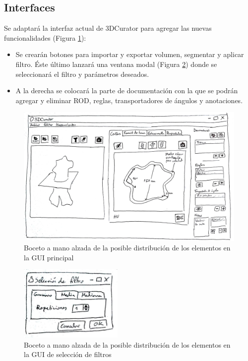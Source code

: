 \subsection{Interfaces}

Se adaptará la interfaz actual de 3DCurator para agregar las nuevas funcionalidades (Figura \ref{fig:requisitos/boceto-gui-ppal}):

\begin{itemize}
	\item Se crearán botones para importar y exportar volumen, segmentar y aplicar filtro. Éste último lanzará una ventana modal (Figura \ref{fig:requisitos/boceto-gui-filtro}) donde se seleccionará el filtro y parámetros deseados.
	\item A la derecha se colocará la parte de documentación con la que se podrán agregar y eliminar ROD, reglas, transportadores de ángulos y anotaciones.
\end{itemize}

\begin{figure}[H]
	\centering
	\includegraphics[width=12cm]{imagenes/requisitos/boceto-gui-ppal}
	\caption{Boceto a mano alzada de la posible distribución de los elementos en la GUI principal}
	\label{fig:requisitos/boceto-gui-ppal}
\end{figure}

\begin{figure}[H]
	\centering
	\includegraphics[width=5cm]{imagenes/requisitos/boceto-gui-filtro}
	\caption{Boceto a mano alzada de la posible distribución de los elementos en la GUI de selección de filtros}
	\label{fig:requisitos/boceto-gui-filtro}
\end{figure}
